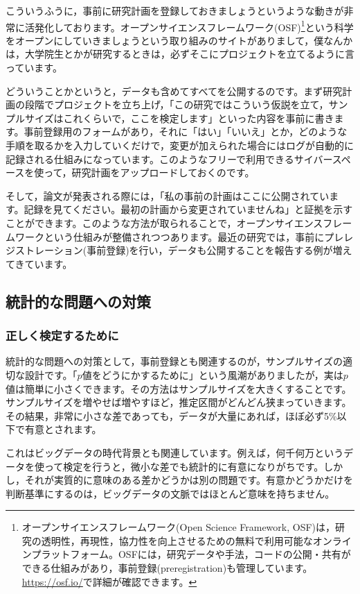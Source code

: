 \documentclass{ltjsbook}
\begin{document}
こういうふうに，事前に研究計画を登録しておきましょうというような動きが非常に活発化しております。オープンサイエンスフレームワーク(OSF)\footnote{オープンサイエンスフレームワーク(Open Science Framework, OSF)は，研究の透明性，再現性，協力性を向上させるための無料で利用可能なオンラインプラットフォーム。OSFには，研究データや手法，コードの公開・共有ができる仕組みがあり，事前登録(preregistration)も管理しています。\url{https://osf.io/}で詳細が確認できます。}という科学をオープンにしていきましょうという取り組みのサイトがありまして，僕なんかは，大学院生とかが研究するときは，必ずそこにプロジェクトを立てるように言っています。

どういうことかというと，データも含めてすべてを公開するのです。まず研究計画の段階でプロジェクトを立ち上げ，「この研究ではこういう仮説を立て，サンプルサイズはこれくらいで，ここを検定します」といった内容を事前に書きます。事前登録用のフォームがあり，それに「はい」「いいえ」とか，どのような手順を取るかを入力していくだけで，変更が加えられた場合にはログが自動的に記録される仕組みになっています。このようなフリーで利用できるサイバースペースを使って，研究計画をアップロードしておくのです。

そして，論文が発表される際には，「私の事前の計画はここに公開されています。記録を見てください。最初の計画から変更されていませんね」と証拠を示すことができます。このような方法が取られることで，オープンサイエンスフレームワークという仕組みが整備されつつあります。最近の研究では，事前にプレレジストレーション(事前登録)を行い，データも公開することを報告する例が増えてきています。

\subsection{統計的な問題への対策}
\subsubsection{正しく検定するために}

統計的な問題への対策として，事前登録とも関連するのが，サンプルサイズの適切な設計です。「$p$値をどうにかするために」という風潮がありましたが，実は$p$値は簡単に小さくできます。その方法はサンプルサイズを大きくすることです。サンプルサイズを増やせば増やすほど，推定区間がどんどん狭まっていきます。その結果，非常に小さな差であっても，データが大量にあれば，ほぼ必ず5\%以下で有意とされます。

これはビッグデータの時代背景とも関連しています。例えば，何千何万というデータを使って検定を行うと，微小な差でも統計的に有意になりがちです。しかし，それが実質的に意味のある差かどうかは別の問題です。有意かどうかだけを判断基準にするのは，ビッグデータの文脈ではほとんど意味を持ちません。
\end{document}
